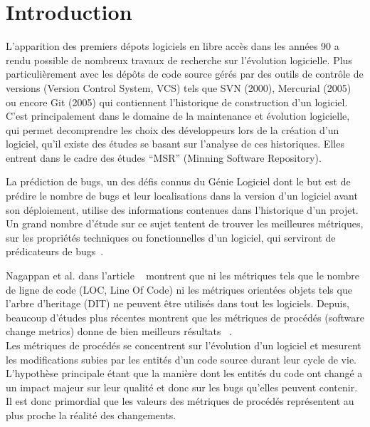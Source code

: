 \section{Introduction}
\label{sec:intro}

L'apparition des premiers dépots logiciels en libre accès dans les années 90 a rendu possible de nombreux travaux de recherche sur l'évolution logicielle. Plus particulièrement avec les dépôts de code source gérés par des outils de contrôle de versions (Version Control System, VCS) tels que  SVN (2000), Mercurial (2005) ou encore Git (2005) qui contiennent l'historique de construction d'un logiciel.\\  

C'est principalement dans le domaine de la maintenance et évolution logicielle, qui permet decomprendre les choix des développeurs lors de la création d'un logiciel, qu'il existe des études se basant sur l'analyse de ces historiques. Elles entrent dans le cadre des études ``MSR'' (Minning Software Repository).

La prédiction de bugs, un des défis connus du Génie Logiciel dont le but est de prédire le nombre de bugs et leur localisations dans la version d'un logiciel avant son déploiement, utilise des informations contenues dans l'historique d'un projet. Un grand nombre d'étude sur ce sujet tentent de trouver les meilleures métriques, sur les propriétés techniques ou fonctionnelles d'un logiciel, qui serviront de prédicateurs de bugs~\cite{fenton_critique_1999}.

Nagappan et al. dans l'article ~\cite{nagappan_mining_2006} montrent que ni les métriques tels que le nombre de ligne de code (LOC, Line Of Code) ni les métriques orientées objets tels que l'arbre d'heritage (DIT) ne peuvent être utilisés dans tout les logiciels. Depuis, beaucoup d'études plus récentes montrent que les métriques de procédés (software change metrics) donne de bien meilleurs résultats ~\cite{nagappan_use_2005,weyuker_too_2008,bird_dont_2011,giger_can_2012}.\\

Les métriques de procédés se concentrent sur l'évolution d'un logiciel et mesurent les modifications subies par les entités d'un code source durant leur cycle de vie. L'hypothèse principale étant que la manière dont les entités du code ont changé a un impact majeur sur leur qualité et donc sur les bugs qu'elles peuvent contenir. Il est donc primordial que les valeurs des métriques de procédés représentent au plus proche la réalité des changements.

